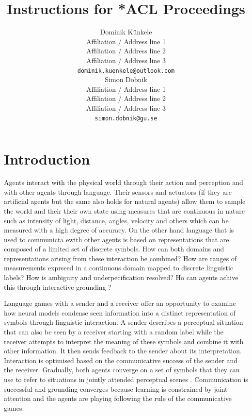 \documentclass[11pt]{article}
\title{Instructions for *ACL Proceedings}
\author{Dominik Künkele \\
  Affiliation / Address line 1 \\
  Affiliation / Address line 2 \\
  Affiliation / Address line 3 \\
  \texttt{dominik.kuenkele@outlook.com} \\\And
  Simon Dobnik \\
  Affiliation / Address line 1 \\
  Affiliation / Address line 2 \\
  Affiliation / Address line 3 \\
  \texttt{simon.dobnik@gu.se} \\}
\begin{document}
\maketitle
\begin{abstract}

\end{abstract}

\section{Introduction}

Agents interact with the physical world through their action and perception and with other agents through language.
Their sensors and actuators (if they are artificial agents but the same also holds for natural agents) allow them to sample the world and their their own state using measures that are continuous in nature such as intensity of light, distance, angles, velocity and others which can be measured with a high degree of accuracy.
On the other hand language that is used to communicta ewith other agents is based on representations that are composed of a limited set of discrete symbols.
How can both domains and representations arising from these interaction be combined? How are ranges of measurements exprseed in a continuous domain mapped to discrete linguistic labels?
How is ambiguity and underpecification resolved?
Ho can agents achive this through interactive grounding \citep{Regier:1996,Roy:2005,Cooper:2023aa}?



Language games with a sender and a receiver \citep{Clark:1996aa,Bartlett:2005aa,Kirby:2008ab,SteelsLoetzsch:2009,Zaslavsky:2018aa} offer an opportunity to examine how neural models condense seen information into a distinct representation of symbols through linguistic interaction.
A sender describes a perceptual situation that can also be seen by a receiver starting with a random label while
the receiver attempts to interpret the meaning of these symbols and combine it with other information.
It then sends feedback to the sender about its interpretation.
Interaction is optimised based on the communicative success of the sender and the receiver.
Gradually, both agents converge on a set of symbols that they can use to refer to situations in jointly attended perceptual scenes \citep{Chai:2016aa,Kelleher:2020aa}.
Communication is successful and grounding converges because learning is constrained by joint attention and the agents are playing following the rule of the communicative games.
\end{document}
